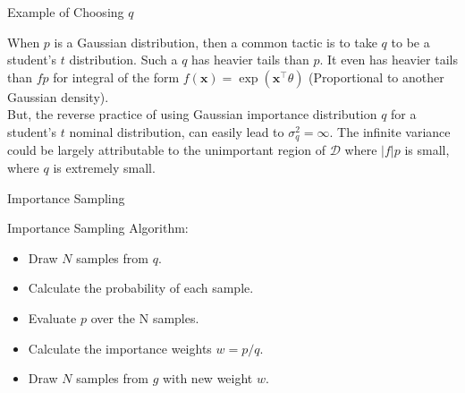 \begin{frame}{Example of Choosing $q$}

When $p$ is a Gaussian distribution, then a common tactic is to take $q$ to be a student's $t$ distribution. Such a $q$ has heavier tails than $p$. It even has heavier tails than $fp$ for integral of the form $f(\boldsymbol{x})=\exp \left(\boldsymbol{x}^{\top} \theta\right)$ (Proportional to another Gaussian density).\\
But, the reverse practice of using Gaussian importance distribution $q$ for a student's $t$ nominal distribution, can easily lead to $\sigma_{q}^{2}=\infty$. The infinite variance could be largely attributable to the unimportant region of $\mathcal{D}$ where $|f| p$ is small, where $q$ is extremely small.

\end{frame}

\begin{frame}{Importance Sampling}
\begin{block}{Importance Sampling Algorithm:}
\begin{itemize}
\item Draw $N$ samples from $q$.
\item Calculate the probability of each sample.
\item Evaluate $p$ over the N samples.
\item Calculate the importance weights $w=p / q$.
\item Draw $N$ samples from $g$ with new weight $w$.
\end{itemize}
\end{block}

\end{frame}

